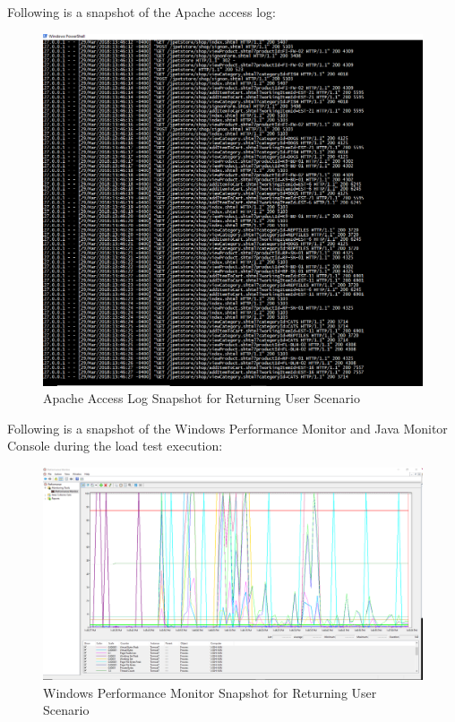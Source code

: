 \documentclass[fontsize=12pt,paper=letter,twoside]{scrartcl}
\begin{document}
\bigskip
\noindent Following is a snapshot of the Apache access log:
\begin{figure}[!htb]
\begin{center}
\includegraphics[width=.8\textwidth]{../../load-test/test-plans/returning-user/access-log.png}
\end{center}
\caption{Apache Access Log Snapshot for Returning User Scenario}
\label{fig:ruser:access_log}
\end{figure}

\clearpage
\bigskip
\noindent Following is a snapshot of the Windows Performance Monitor and Java Monitor Console during the load test execution:

\begin{figure}[!htb]
\begin{center}
\includegraphics[width=.7\textwidth]{../../load-test/test-plans/returning-user/perfmon-ru.png}
\end{center}
\caption{Windows Performance Monitor Snapshot for Returning User Scenario}
\label{fig:ruser:perfmon}
\end{figure}
\end{document}
